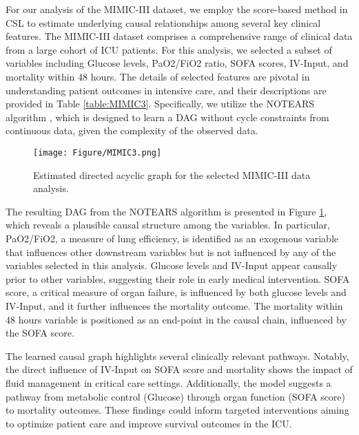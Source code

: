For our analysis of the \acrshort{MIMIC-III} dataset, we employ the score-based method in \acrshort{CSL} to estimate underlying causal relationships among several key clinical features. The \acrshort{MIMIC-III} dataset comprises a comprehensive range of clinical data from a large cohort of \acrshort{ICU} patients. For this analysis, we selected a subset of variables including Glucose levels, PaO2/FiO2 ratio, \acrshort{SOFA} scores, IV-Input, and mortality within 48 hours. The details of selected features are pivotal in understanding patient outcomes in intensive care, and their descriptions are provided in Table \ref{table:MIMIC3}. Specifically, we utilize the NOTEARS algorithm \citep{zheng2018dags}, which is designed to learn a \acrshort{DAG} without cycle constraints from continuous data, given the complexity of the observed data. %

\begin{figure}
    \centering
    \texttt{[image: Figure/MIMIC3.png]}
    \caption{Estimated directed acyclic graph for the selected \acrshort{MIMIC-III} data analysis.}
    \label{fig:DAG_mimic}
\end{figure}

The resulting \acrshort{DAG} from the NOTEARS algorithm is presented in Figure \ref{fig:DAG_mimic}, which reveals a plausible causal structure among the variables. In particular, PaO2/FiO2, a measure of lung efficiency, is identified as an exogenous variable that influences other downstream variables but is not influenced by any of the variables selected in this analysis. Glucose levels and IV-Input appear causally prior to other variables, suggesting their role in early medical intervention. \acrshort{SOFA} score, a critical measure of organ failure, is influenced by both glucose levels and IV-Input, and it further influences the mortality outcome. 
The mortality within 48 hours variable is positioned as an end-point in the causal chain, influenced by the \acrshort{SOFA} score.

The learned causal graph highlights several clinically relevant pathways. Notably, the direct influence of IV-Input on \acrshort{SOFA} score and mortality shows the impact of fluid management in critical care settings. Additionally, the model suggests a pathway from metabolic control (Glucose) through organ function (\acrshort{SOFA} score) to mortality outcomes. These findings could inform targeted interventions aiming to optimize patient care and improve survival outcomes in the \acrshort{ICU}.


